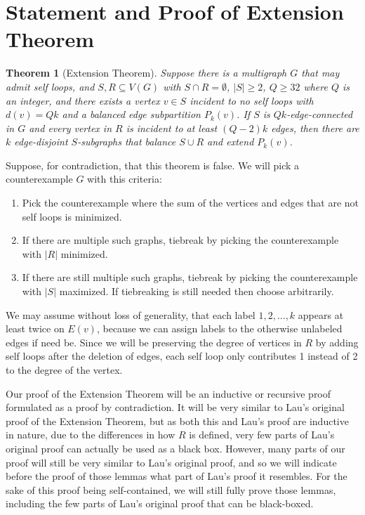 \documentclass{article}
\newtheorem{theorem}{Theorem}[section]
\begin{document}
\section{Statement and Proof of Extension Theorem}

\begin{theorem}[Extension Theorem]
    Suppose there is a multigraph $G$ that may admit self loops, and $S, R \subseteq V(G)$ with $S \cap R = \emptyset$, $|S| \geq 2$, $Q \geq 32$ where $Q$ is an integer, and there exists a vertex $v \in S$ incident to no self loops with $d(v)=Qk$ and a balanced edge subpartition $P_k(v)$. If $S$ is $Qk$-edge-connected in $G$ and every vertex in $R$ is incident to at least $(Q-2)k$ edges, then there are $k$ edge-disjoint $S$-subgraphs that balance $S \cup R$ and extend $P_k(v)$.
\end{theorem}
Suppose, for contradiction, that this theorem is false. We will pick a counterexample $G$ with this criteria:

\begin{enumerate}
    \item Pick the counterexample where the sum of the vertices and edges that are not self loops is minimized. 
    \item If there are multiple such graphs, tiebreak by picking the counterexample with $|R|$ minimized. 
    \item If there are still multiple such graphs, tiebreak by picking the counterexample with $|S|$ maximized. If tiebreaking is still needed then choose arbitrarily. 
\end{enumerate}

We may assume without loss of generality, that each label $1,2,...,k$ appears at least twice on $E(v)$, because we can assign labels to the otherwise unlabeled edges if need be. Since we will be preserving the degree of vertices in $R$ by adding self loops after the deletion of edges, each self loop only contributes 1 instead of 2 to the degree of the vertex.

Our proof of the Extension Theorem will be an inductive or recursive proof formulated as a proof by contradiction. It will be very similar to Lau's original proof of the Extension Theorem, but as both this and Lau's proof are inductive in nature, due to the differences in how $R$ is defined, very few parts of Lau's original proof can actually be used as a black box. However, many parts of our proof will still be very similar to Lau's original proof, and so we will indicate before the proof of those lemmas what part of Lau's proof it resembles. For the sake of this proof being self-contained, we will still fully prove those lemmas, including the few parts of Lau's original proof that can be black-boxed. 
\end{document}
